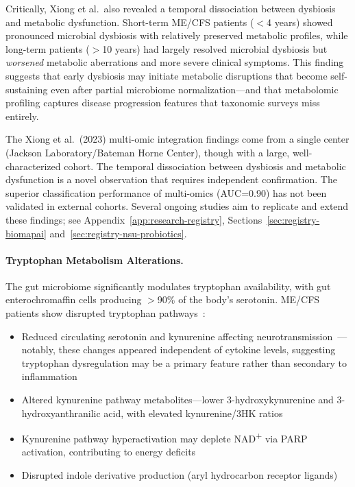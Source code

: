 Critically, Xiong et al.\ also revealed a temporal dissociation between dysbiosis and metabolic dysfunction. Short-term ME/CFS patients ($<$4 years) showed pronounced microbial dysbiosis with relatively preserved metabolic profiles, while long-term patients ($>$10 years) had largely resolved microbial dysbiosis but \textit{worsened} metabolic aberrations and more severe clinical symptoms. This finding suggests that early dysbiosis may initiate metabolic disruptions that become self-sustaining even after partial microbiome normalization---and that metabolomic profiling captures disease progression features that taxonomic surveys miss entirely.

\begin{warning}
The Xiong et al.\ (2023) multi-omic integration findings come from a single center (Jackson Laboratory/Bateman Horne Center), though with a large, well-characterized cohort. The temporal dissociation between dysbiosis and metabolic dysfunction is a novel observation that requires independent confirmation. The superior classification performance of multi-omics (AUC=0.90) has not been validated in external cohorts. Several ongoing studies aim to replicate and extend these findings; see Appendix~\ref{app:research-registry}, Sections~\ref{sec:registry-biomapai} and~\ref{sec:registry-nsu-probiotics}.
\end{warning}

\paragraph{Tryptophan Metabolism Alterations.}

The gut microbiome significantly modulates tryptophan availability, with gut enterochromaffin cells producing $>$90\% of the body's serotonin. ME/CFS patients show disrupted tryptophan pathways~\cite{Kavyani2022kynurenine,Abujrais2024tryptophan}:
\begin{itemize}
    \item Reduced circulating serotonin and kynurenine affecting neurotransmission~\cite{Simonato2021tryptophan}---notably, these changes appeared independent of cytokine levels, suggesting tryptophan dysregulation may be a primary feature rather than secondary to inflammation
    \item Altered kynurenine pathway metabolites---lower 3-hydroxykynurenine and 3-hydroxyanthranilic acid, with elevated kynurenine/3HK ratios~\cite{Abujrais2024tryptophan}
    \item Kynurenine pathway hyperactivation may deplete NAD\textsuperscript{+} via PARP activation, contributing to energy deficits~\cite{Dehhaghi2022kynurenine, Dehhaghi2022AD}
    \item Disrupted indole derivative production (aryl hydrocarbon receptor ligands)
\end{itemize}

